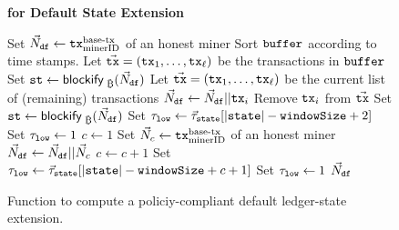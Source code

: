 {  \begin{figure}
  \begin{algobox}{{\bf for Default State Extension}}
    \begin{algorithmic}
      \State {\it \textcolor{gray}{We assume call-by-value and hence the function has no side effects.}}
      \State {\it \textcolor{gray}{The function returns a policy-compliant extension of the ledger state.}}
      \State
      \State Set $\vec{N}_{\texttt{df}}\gets \texttt{tx}^{\text{base-tx}}_{\text{minerID}}$ of an honest
      miner
      \State Sort $\texttt{buffer}$ according to time stamps.
      \State Let $\vec{\texttt{tx}}=(\texttt{tx}_1,\dots,\texttt{tx}_{\ell})$ be the transactions in $\texttt{buffer}$
      \State Set $\st \gets \bitcoinBlockify(\defaultblock)$
      \Repeat
      \State Let $\vec{\texttt{tx}}=(\texttt{tx}_1,\dots,\texttt{tx}_{\ell})$ be the current list of (remaining) transactions
      \State $\vec{N}_{\texttt{df}} \gets \vec{N}_{\texttt{df}}||\texttt{tx}_i$
      \State Remove $\texttt{tx}_i$ from $\vec{\texttt{tx}}$
      \State Set $\st \gets \bitcoinBlockify(\defaultblock)$
      \EndIf
      \EndFor
      \State {}
      \If{$|\state| + 1 \geq \windowSize$}
      \State Set $\tau_\texttt{low} \gets \vec{\tau}_\texttt{state}[|\texttt{state}|-\texttt{windowSize} + 2]$
      \Else
      \State Set  $\tau_\texttt{low} \gets 1$ 
      \EndIf
      \State $c \gets 1$
      \State Set $\vec{N}_c \gets \texttt{tx}^{\text{base-tx}}_{\text{minerID}}$ of an honest miner
      \State $\vec{N}_{\texttt{df}} \gets \vec{N}_{\texttt{df}}||\vec{N}_c$
      \State $c \gets c+1$
      \State {}
      \State Set $\tau_\texttt{low} \gets \vec{\tau}_\texttt{state}[|\texttt{state}|-\texttt{windowSize} + c + 1]$
      \Else
      \State Set  $\tau_\texttt{low} \gets 1$
      \EndIf
      \EndWhile  
      \State \Return $\vec{N}_{\texttt{df}}$
      \EndFunction
    \end{algorithmic}
  \end{algobox}
  \caption{Function to compute a policiy-compliant default ledger-state extension.}
  \label{fig:defaultExtension}
  \end{figure}
  }%


